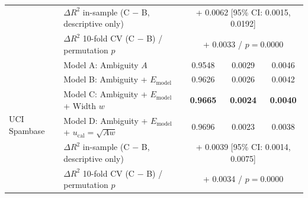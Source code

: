 \begin{table}[htbp]
\begin{tabular}{llccc}
 & $\Delta R^2$ in-sample (C $-$ B, descriptive only) & \multicolumn{3}{c}{+ 0.0062 [95\% CI: 0.0015, 0.0192]} \\
 & $\Delta R^2$ 10-fold CV (C $-$ B) / permutation $p$ & \multicolumn{3}{c}{+ 0.0033 / $p=0.0000$} \\
\midrule
\multirow{6}{*}{UCI Spambase} & Model A: Ambiguity $A$ & 0.9548 & 0.0029 & 0.0046 \\
 & Model B: Ambiguity + $E_{\mathrm{model}}$ & 0.9626 & 0.0026 & 0.0042 \\
 & Model C: Ambiguity + $E_{\mathrm{model}}$ + Width $w$ & \textbf{0.9665} & \textbf{0.0024} & \textbf{0.0040} \\
 & Model D: Ambiguity + $E_{\mathrm{model}}$ + $u_{\mathrm{cal}}=\sqrt{Aw}$ & 0.9696 & 0.0023 & 0.0038 \\
 & $\Delta R^2$ in-sample (C $-$ B, descriptive only) & \multicolumn{3}{c}{+ 0.0039 [95\% CI: 0.0014, 0.0075]} \\
 & $\Delta R^2$ 10-fold CV (C $-$ B) / permutation $p$ & \multicolumn{3}{c}{+ 0.0034 / $p=0.0000$} \\
\bottomrule
\end{tabular}
\end{table}
